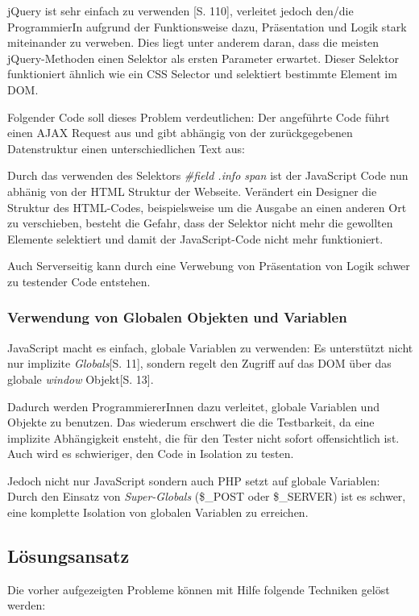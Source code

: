 \documentclass[a4paper,bibtotoc,oneside]{scrbook}
\begin{document}
jQuery ist sehr einfach zu verwenden \cite{jquery}[S. 110], verleitet jedoch den/die ProgrammierIn aufgrund der Funktionsweise dazu, Präsentation und Logik stark miteinander zu verweben. Dies liegt unter anderem daran, dass die meisten jQuery-Methoden einen Selektor als ersten Parameter erwartet. Dieser Selektor funktioniert ähnlich wie ein CSS Selector und selektiert bestimmte Element im DOM. \cite{jquery_selectors}

Folgender Code soll dieses Problem verdeutlichen: Der angeführte Code führt einen AJAX Request aus und gibt abhängig von der zurückgegebenen Datenstruktur einen unterschiedlichen Text aus:




Durch das verwenden des Selektors \emph{\#field .info span} ist der JavaScript Code nun abhänig von der HTML Struktur der Webseite. Verändert ein Designer  die Struktur des HTML-Codes, beispielsweise um die Ausgabe an einen anderen Ort zu verschieben, besteht die Gefahr, dass der Selektor nicht mehr die gewollten Elemente selektiert und damit der JavaScript-Code nicht mehr funktioniert.

Auch Serverseitig kann durch eine Verwebung von Präsentation von Logik schwer zu testender Code entstehen.

\subsubsection{Verwendung von Globalen Objekten und Variablen}
JavaScript macht es einfach, globale Variablen zu verwenden: Es unterstützt nicht nur implizite \emph{Globals}\cite{js_patterns}[S. 11], sondern regelt den Zugriff auf das DOM über das globale \emph{window} Objekt\cite{js_patterns}[S. 13].

Dadurch werden ProgrammiererInnen dazu verleitet, globale Variablen und Objekte zu benutzen. Das wiederum erschwert die die Testbarkeit, da eine implizite Abhängigkeit ensteht, die für den Tester nicht sofort offensichtlich ist. Auch wird es schwieriger, den Code in Isolation zu testen.

Jedoch nicht nur JavaScript sondern auch PHP setzt auf globale Variablen: Durch den Einsatz von \emph{Super-Globals} (\$\_POST oder \$\_SERVER) ist es schwer, eine komplette Isolation von globalen Variablen zu erreichen.

\subsection{Lösungsansatz}
Die vorher aufgezeigten Probleme können mit Hilfe folgende Techniken gelöst werden:
\end{document}
